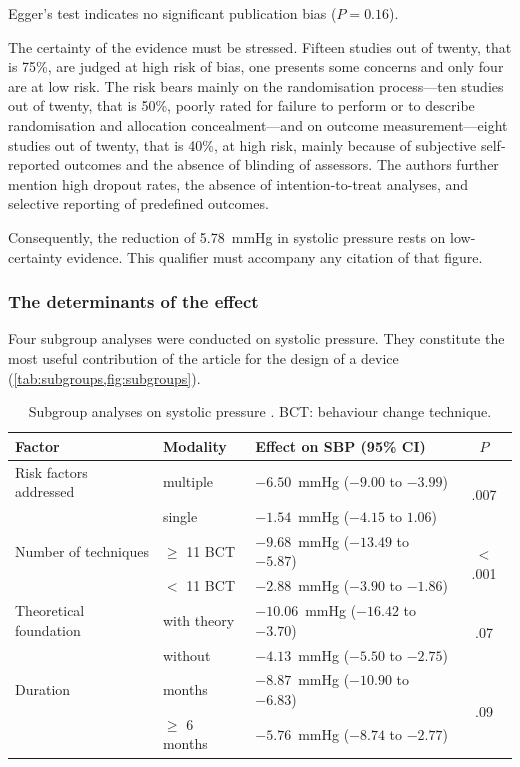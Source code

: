 \documentclass[12pt,a4paper,oneside]{report}
\begin{document}
Egger's test indicates no significant publication bias ($P = 0.16$).

The certainty of the evidence must be stressed. Fifteen studies out of twenty, that is 75\%, are judged at high risk of bias, one presents some concerns and only four are at low risk. The risk bears mainly on the randomisation process---ten studies out of twenty, that is 50\%, poorly rated for failure to perform or to describe randomisation and allocation concealment---and on outcome measurement---eight studies out of twenty, that is 40\%, at high risk, mainly because of subjective self-reported outcomes and the absence of blinding of assessors. The authors further mention high dropout rates, the absence of intention-to-treat analyses, and selective reporting of predefined outcomes.

Consequently, the reduction of 5.78~mmHg in systolic pressure rests on low-certainty evidence. This qualifier must accompany any citation of that figure.

\subsubsection{The determinants of the effect}

Four subgroup analyses were conducted on systolic pressure. They constitute the most useful contribution of the article for the design of a device (\cref{tab:subgroups,fig:subgroups}).

\begin{table}[htbp]
\centering\small
\caption{Subgroup analyses on systolic pressure \parencite{zhou2024}. BCT: behaviour change technique.}\label{tab:subgroups}
\begin{tabularx}{\textwidth}{@{}>{\raggedright\arraybackslash}p{3.3cm} >{\raggedright\arraybackslash}p{2.5cm} X c@{}}
\toprule
\textbf{Factor} & \textbf{Modality} & \textbf{Effect on SBP (95\% CI)} & \textbf{$P$} \\
\midrule
Risk factors addressed & multiple & $-6.50$~mmHg ($-9.00$ to $-3.99$) & \multirow{2}{*}{.007} \\
                       & single   & $-1.54$~mmHg ($-4.15$ to $1.06$) & \\
\addlinespace
Number of techniques & $\geq$ 11 BCT & $-9.68$~mmHg ($-13.49$ to $-5.87$) & \multirow{2}{*}{$<$.001} \\
                     & $<$ 11 BCT    & $-2.88$~mmHg ($-3.90$ to $-1.86$) & \\
\addlinespace
Theoretical foundation & with theory & $-10.06$~mmHg ($-16.42$ to $-3.70$) & \multirow{2}{*}{.07} \\
                       & without     & $-4.13$~mmHg ($-5.50$ to $-2.75$) & \\
\addlinespace
Duration & 3 months & $-8.87$~mmHg ($-10.90$ to $-6.83$) & \multirow{2}{*}{.09} \\
         & $\geq$ 6 months & $-5.76$~mmHg ($-8.74$ to $-2.77$) & \\
\bottomrule
\end{tabularx}
\end{table}
\end{document}
